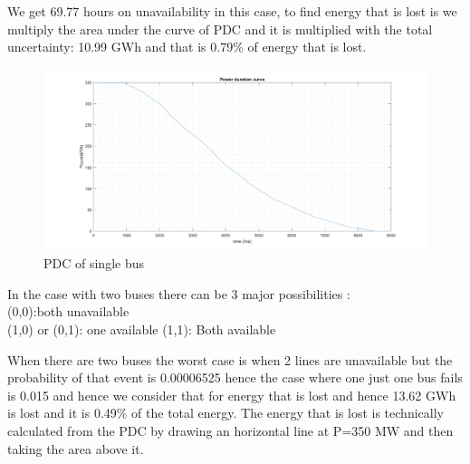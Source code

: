 We get 69.77 hours on unavailability in this case, to find energy that is lost is we multiply the area under the curve of PDC and it is multiplied with the total uncertainty: 10.99 GWh and that is 0.79\% of energy that is lost.
\begin{figure}
    \centering
        \includegraphics[width=0.8 \linewidth]{PDC_Q6.png}
        \caption{PDC of single bus}
        \label{fig:PDC for single bus}
\end{figure}
In the case with two buses there can be 3 major possibilities :\\
(0,0):both unavailable\\
(1,0) or (0,1): one available
(1,1): Both available

When there are two buses the worst case is when 2 lines are unavailable but the probability of that event is 0.00006525 hence the case where one just one bus fails is 0.015 and hence we consider that for energy that is lost and hence 13.62 GWh is lost and it is 0.49\% of the total energy. The energy that is lost is technically calculated from the PDC by drawing an horizontal line at P=350 MW and then taking the area above it. 

     
     



